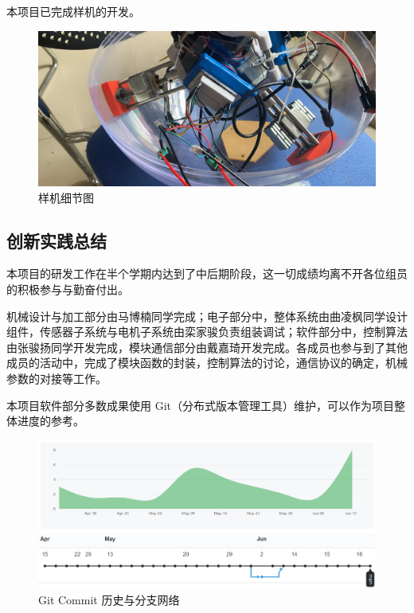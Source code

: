 \documentclass[a4paper]{ctexart}
\numberwithin{equation}{section}
\numberwithin{table}{section}
\numberwithin{figure}{section}
\begin{document}
本项目已完成样机的开发。

\begin{figure}[H]
  \begin{center}
    \includegraphics[width=0.8\linewidth]{figures/result1.png}
  \end{center}
  \caption{样机细节图}
\end{figure}

\subsection{创新实践总结}

本项目的研发工作在半个学期内达到了中后期阶段，这一切成绩均离不开各位组员的积极参与与勤奋付出。

机械设计与加工部分由马博楠同学完成；电子部分中，整体系统由曲凌枫同学设计组件，传感器子系统与电机子系统由栾家骏负责组装调试；软件部分中，控制算法由张骏扬同学开发完成，模块通信部分由戴嘉琦开发完成。各成员也参与到了其他成员的活动中，完成了模块函数的封装，控制算法的讨论，通信协议的确定，机械参数的对接等工作。

本项目软件部分多数成果使用 Git（分布式版本管理工具）维护，可以作为项目整体进度的参考。

\begin{figure}[H]
  \begin{minipage}{0.98\linewidth}
    \begin{center}
      \includegraphics[width=0.98\linewidth]{figures/github.png}
    \end{center}
  \end{minipage}
  \vfill
  \begin{minipage}{0.98\linewidth}
    \begin{center}
      \includegraphics[width=0.98\linewidth]{figures/gitnetwork.png}
    \end{center}
  \end{minipage}
  \caption{Git Commit 历史与分支网络}
\end{figure}




\newpage
\thispagestyle{fancy}
\lhead{}
\chead{\it\small{\textcolor{grey}{参考文献}}}
\rhead{}
{}


\end{document}
